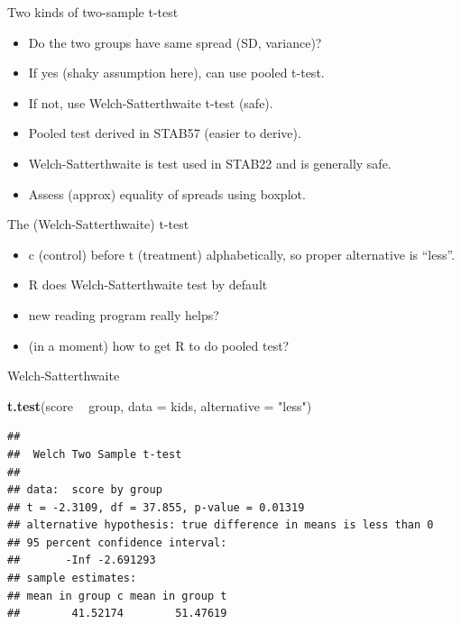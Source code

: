 \documentclass[ignorenonframetext,]{beamer}
\newenvironment{Shaded}{\begin{snugshade}}{\end{snugshade}}
\newcommand{\DataTypeTok}[1]{\textcolor[rgb]{0.13,0.29,0.53}{#1}}
\newcommand{\KeywordTok}[1]{\textcolor[rgb]{0.13,0.29,0.53}{\textbf{#1}}}
\newcommand{\NormalTok}[1]{#1}
\newcommand{\OperatorTok}[1]{\textcolor[rgb]{0.81,0.36,0.00}{\textbf{#1}}}
\newcommand{\StringTok}[1]{\textcolor[rgb]{0.31,0.60,0.02}{#1}}
\providecommand{\tightlist}{%
  \setlength{\itemsep}{0pt}\setlength{\parskip}{0pt}}
\begin{document}
\begin{frame}{Two kinds of two-sample t-test}
\protect\hypertarget{two-kinds-of-two-sample-t-test}{}

\begin{itemize}
\tightlist
\item
  Do the two groups have same spread (SD, variance)?
\item
  If yes (shaky assumption here), can use pooled t-test.
\item
  If not, use Welch-Satterthwaite t-test (safe).
\item
  Pooled test derived in STAB57 (easier to derive).
\item
  Welch-Satterthwaite is test used in STAB22 and is generally safe.
\item
  Assess (approx) equality of spreads using boxplot.
\end{itemize}

\end{frame}

\begin{frame}{The (Welch-Satterthwaite) t-test}
\protect\hypertarget{the-welch-satterthwaite-t-test}{}

\begin{itemize}
\tightlist
\item
  c (control) before t (treatment) alphabetically, so proper alternative
  is ``less''.
\item
  R does Welch-Satterthwaite test by default
\item
  new reading program really helps?
\item
  (in a moment) how to get R to do pooled test?
\end{itemize}

\end{frame}

\begin{frame}[fragile]{Welch-Satterthwaite}
\protect\hypertarget{welch-satterthwaite}{}

\begin{Shaded}
\begin{Highlighting}[]
\KeywordTok{t.test}\NormalTok{(score }\OperatorTok{~}\StringTok{ }\NormalTok{group, }\DataTypeTok{data =}\NormalTok{ kids, }\DataTypeTok{alternative =} \StringTok{"less"}\NormalTok{)}
\end{Highlighting}
\end{Shaded}

\begin{verbatim}
## 
##  Welch Two Sample t-test
## 
## data:  score by group
## t = -2.3109, df = 37.855, p-value = 0.01319
## alternative hypothesis: true difference in means is less than 0
## 95 percent confidence interval:
##       -Inf -2.691293
## sample estimates:
## mean in group c mean in group t 
##        41.52174        51.47619
\end{verbatim}

\end{frame}
\end{document}
